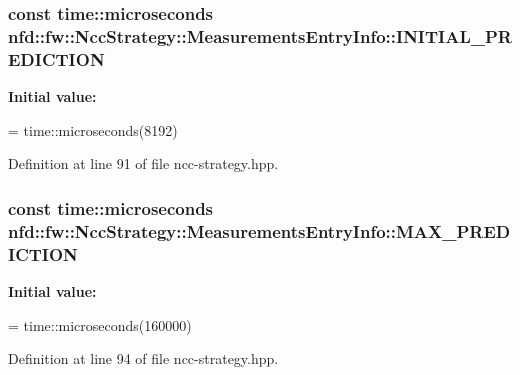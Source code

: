 \subsubsection[{\texorpdfstring{I\+N\+I\+T\+I\+A\+L\+\_\+\+P\+R\+E\+D\+I\+C\+T\+I\+ON}{INITIAL\_PREDICTION}}]{\setlength{\rightskip}{0pt plus 5cm}const time\+::microseconds nfd\+::fw\+::\+Ncc\+Strategy\+::\+Measurements\+Entry\+Info\+::\+I\+N\+I\+T\+I\+A\+L\+\_\+\+P\+R\+E\+D\+I\+C\+T\+I\+ON\hspace{0.3cm}{\ttfamily [static]}}\hypertarget{classnfd_1_1fw_1_1NccStrategy_1_1MeasurementsEntryInfo_ae2f52c95a0e7c970c2a6b3abbc175666}{}\label{classnfd_1_1fw_1_1NccStrategy_1_1MeasurementsEntryInfo_ae2f52c95a0e7c970c2a6b3abbc175666}
{\bfseries Initial value\+:}
\begin{DoxyCode}
=
                                                             time::microseconds(8192)
\end{DoxyCode}


Definition at line 91 of file ncc-\/strategy.\+hpp.

\subsubsection[{\texorpdfstring{M\+A\+X\+\_\+\+P\+R\+E\+D\+I\+C\+T\+I\+ON}{MAX\_PREDICTION}}]{\setlength{\rightskip}{0pt plus 5cm}const time\+::microseconds nfd\+::fw\+::\+Ncc\+Strategy\+::\+Measurements\+Entry\+Info\+::\+M\+A\+X\+\_\+\+P\+R\+E\+D\+I\+C\+T\+I\+ON\hspace{0.3cm}{\ttfamily [static]}}\hypertarget{classnfd_1_1fw_1_1NccStrategy_1_1MeasurementsEntryInfo_acd20ecb727553618567091b7675c667c}{}\label{classnfd_1_1fw_1_1NccStrategy_1_1MeasurementsEntryInfo_acd20ecb727553618567091b7675c667c}
{\bfseries Initial value\+:}
\begin{DoxyCode}
=
                                                             time::microseconds(160000)
\end{DoxyCode}


Definition at line 94 of file ncc-\/strategy.\+hpp.

